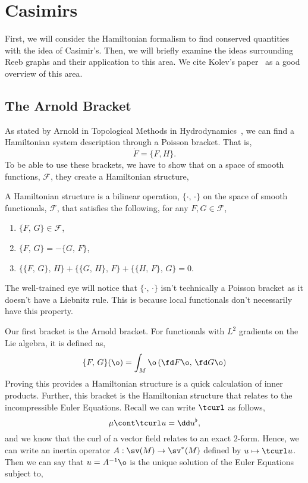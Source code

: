 
\section{Casimirs}
First, we will consider the Hamiltonian formalism to find conserved quantities with the idea of Casimir's. Then, we will briefly examine the ideas surrounding Reeb graphs and their application to this area. We cite Kolev's paper~\cite{Kolev_2007} as a good overview of this area.

\subsection{The Arnold Bracket}
As stated by Arnold in Topological Methods in Hydrodynamics~\cite{tmih}, we can find a Hamiltonian system description through a Poisson bracket. That is,
$$ \dot F = \{F, H\}. $$
\noindent
To be able to use these brackets, we have to show that on a space of smooth functions, $\mathcal{F}$, they create a Hamiltonian structure,
\begin{ndefi}
  A Hamiltonian structure is a bilinear operation, $\{\cdot,\,\cdot\}$ on the space of smooth functionals, $\mathcal{F}$, that satisfies the following, for any $F,G \in \mathcal{F}$,
  \begin{enumerate}
    \item $\{F,\, G\} \in \mathcal{F}$,
    \item $\{F,\, G\} = -\{G,\, F\}$,
    \item $\{\{F,\, G\},\, H\} + \{\{G ,\, H\},\, F\} + \{\{H,\, F\},\, G\} = 0$.
  \end{enumerate}
\end{ndefi}
\begin{remark}
   The well-trained eye will notice that $\{\cdot,\,\cdot\}$ isn't technically a Poisson bracket as it doesn't have a Liebnitz rule. This is because local functionals don't necessarily have this property.
\end{remark}
\noindent
Our first bracket is the Arnold bracket. For functionals with $L^2$ gradients on the Lie algebra, it is defined as,
$$ \{F,\, G\}(\o) = \int_M \o\left( \fd F \o,\, \fd G \o \right) $$
\noindent
Proving this provides a Hamiltonian structure is a quick calculation of inner products. Further, this bracket is the Hamiltonian structure that relates to the incompressible Euler Equations. Recall we can write $\tcurl$ as follows,
$$ \mu \cont \tcurl u = \dd u^\flat, $$
and we know that the curl of a vector field relates to an exact $2$-form. Hence, we can write an inertia operator $A : \sv(M) \to \sv^*(M)$ defined by $u \mapsto \tcurl u$. Then we can say that $u = A^{-1}\o$ is the unique solution of the Euler Equations subject to,
